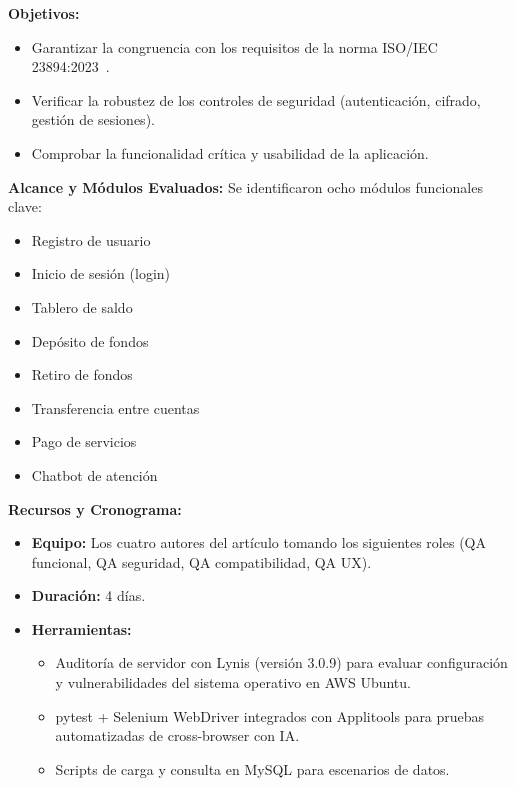 \documentclass[12pt]{article}
\begin{document}
\textbf{Objetivos:}
\begin{itemize}
    \item Garantizar la congruencia con los requisitos de la norma ISO/IEC 23894:2023~\cite{iso23894}.
    \item Verificar la robustez de los controles de seguridad (autenticación, cifrado, gestión de sesiones).
    \item Comprobar la funcionalidad crítica y usabilidad de la aplicación.
\end{itemize}

\textbf{Alcance y Módulos Evaluados:}
Se identificaron ocho módulos funcionales clave:
\begin{itemize}
    \item Registro de usuario
    \item Inicio de sesión (login)
    \item Tablero de saldo
    \item Depósito de fondos
    \item Retiro de fondos
    \item Transferencia entre cuentas
    \item Pago de servicios
    \item Chatbot de atención
\end{itemize}

\textbf{Recursos y Cronograma:}
\begin{itemize}
    \item \textbf{Equipo:} Los cuatro autores del artículo tomando los siguientes roles (QA funcional, QA seguridad, QA compatibilidad, QA UX).
    \item \textbf{Duración:} 4 días.
    \item \textbf{Herramientas:}
    \begin{itemize}
        \item Auditoría de servidor con Lynis (versión 3.0.9) para evaluar configuración y vulnerabilidades del sistema operativo en AWS Ubuntu.
        \item pytest + Selenium WebDriver integrados con Applitools para pruebas automatizadas de cross-browser con IA.
        \item Scripts de carga y consulta en MySQL para escenarios de datos.
    \end{itemize}
\end{itemize}
\end{document}
